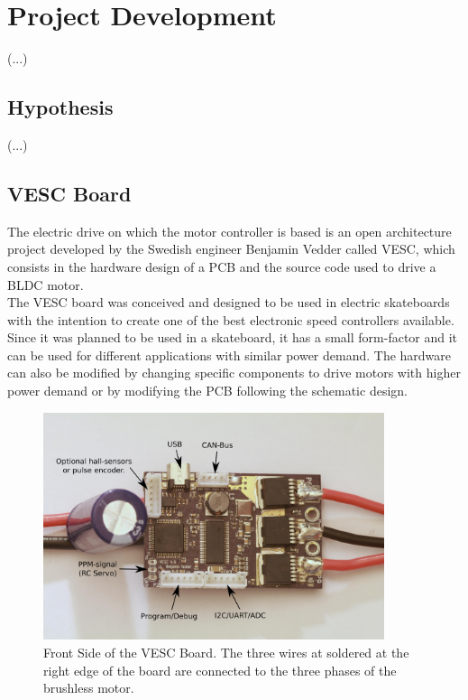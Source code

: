 \chapter{Project Development} \label{chap:implementation}

(...)\\

\section{Hypothesis}

(...)\\

\section{VESC Board}

The electric drive on which the motor controller is based is an open architecture project developed by the Swedish engineer Benjamin Vedder called VESC, which consists in the hardware design of a \ac{PCB} and the source code used to drive a \ac{BLDC} motor.\\

The VESC board was conceived and designed to be used in electric skateboards with the intention to create one of the best electronic speed controllers available. Since it was planned to be used in a skateboard, it has a small form-factor and it can be used for different applications with similar power demand. The hardware can also be modified by changing specific components to drive motors with higher power demand or by modifying the \ac{PCB} following the schematic design.

\begin{figure}[htbp]
\centering
\includegraphics[width=10cm]{Images/pcb_front.png} 
\caption[VESC Front Side]{Front Side of the VESC Board. The three wires at soldered at the right edge of the board are connected to the three phases of the brushless motor.}
\label{fig:pcb_front}
\end{figure}

